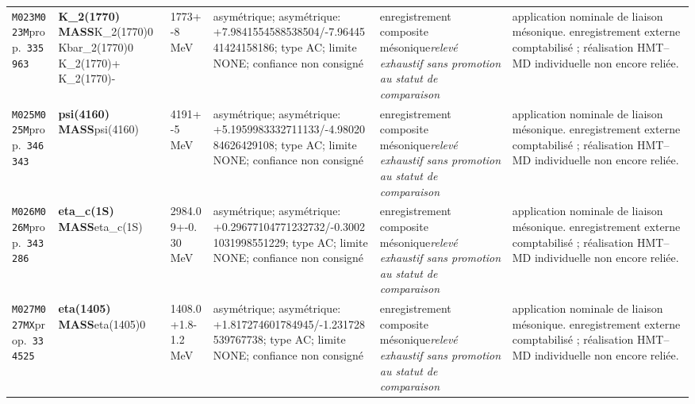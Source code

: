 \begin{landscape}
\begin{longtable}{L{1.85cm}L{4.45cm}L{2.35cm}L{4.05cm}L{3.35cm}L{7.15cm}}
\texttt{M023}\newline \texttt{M023M}\newline prop.\ \texttt{335963} & \textbf{K\_\allowbreak{}2(1770) MASS}\newline K\_\allowbreak{}2(1770)0 \textbar{}\allowbreak{} Kbar\_\allowbreak{}2(1770)0 \textbar{}\allowbreak{} K\_\allowbreak{}2(1770)+ \textbar{}\allowbreak{} K\_\allowbreak{}2(1770)- & 1773+-8\,MeV & asymétrique; asymétrique: +7.9841554588538504/-7.9644541424158186; type AC; limite NONE; confiance non consigné & enregistrement composite mésonique\newline \emph{relevé exhaustif sans promotion au statut de comparaison} & application nominale de liaison mésonique. enregistrement externe comptabilisé ; réalisation HMT--MD individuelle non encore reliée. \\
\texttt{M025}\newline \texttt{M025M}\newline prop.\ \texttt{346343} & \textbf{psi(4160) MASS}\newline psi(4160) & 4191+-5\,MeV & asymétrique; asymétrique: +5.1959983332711133/-4.9802084626429108; type AC; limite NONE; confiance non consigné & enregistrement composite mésonique\newline \emph{relevé exhaustif sans promotion au statut de comparaison} & application nominale de liaison mésonique. enregistrement externe comptabilisé ; réalisation HMT--MD individuelle non encore reliée. \\
\texttt{M026}\newline \texttt{M026M}\newline prop.\ \texttt{343286} & \textbf{eta\_\allowbreak{}c(1S) MASS}\newline eta\_\allowbreak{}c(1S) & 2984.09+-0.30\,MeV & asymétrique; asymétrique: +0.29677104771232732/-0.30021031998551229; type AC; limite NONE; confiance non consigné & enregistrement composite mésonique\newline \emph{relevé exhaustif sans promotion au statut de comparaison} & application nominale de liaison mésonique. enregistrement externe comptabilisé ; réalisation HMT--MD individuelle non encore reliée. \\
\texttt{M027}\newline \texttt{M027MX}\newline prop.\ \texttt{334525} & \textbf{eta(1405) MASS}\newline eta(1405)0 & 1408.0+1.8-1.2\,MeV & asymétrique; asymétrique: +1.817274601784945/-1.231728539767738; type AC; limite NONE; confiance non consigné & enregistrement composite mésonique\newline \emph{relevé exhaustif sans promotion au statut de comparaison} & application nominale de liaison mésonique. enregistrement externe comptabilisé ; réalisation HMT--MD individuelle non encore reliée. \\

\end{longtable}
\end{landscape}
